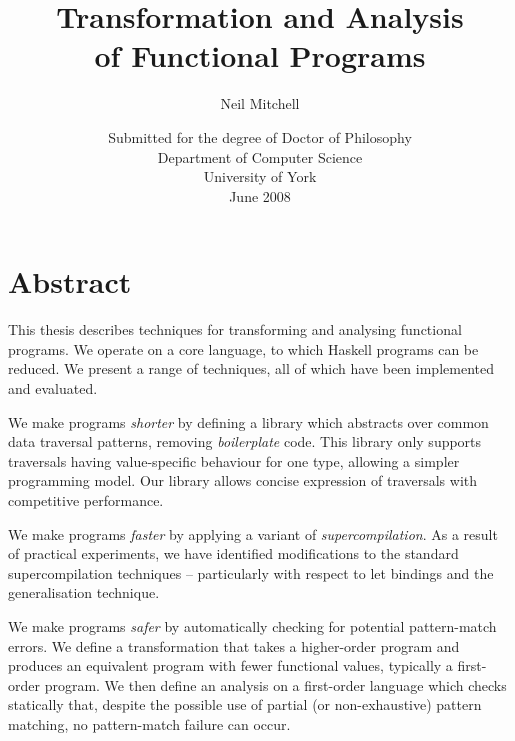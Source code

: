 
\title{Transformation and Analysis \\ of Functional Programs}
\author{Neil Mitchell}
\date{\normalsize{
    \vspace{20mm}
    Submitted for the degree of Doctor of Philosophy \\
    \vspace{10mm}
    Department of Computer Science \\
    University of York \\
    June 2008}}

\maketitle

\setcounter{page}{2}

\chapter*{Abstract}

This thesis describes techniques for transforming and analysing functional programs. We operate on a core language, to which Haskell programs can be reduced. We present a range of techniques, all of which have been implemented and evaluated.

We make programs \textit{shorter} by defining a library which abstracts over common data traversal patterns, removing \textit{boilerplate} code. This library only supports traversals having value-specific behaviour for one type, allowing a simpler programming model. Our library allows concise expression of traversals with competitive performance.

We make programs \textit{faster} by applying a variant of \textit{supercompilation}. As a result of practical experiments, we have identified modifications to the standard supercompilation techniques -- particularly with respect to let bindings and the generalisation technique.

We make programs \textit{safer} by automatically checking for potential pattern-match errors. We define a transformation that takes a higher-order program and produces an equivalent program with fewer functional values, typically a first-order program. We then define an analysis on a first-order language which checks statically that, despite the possible use of partial (or non-exhaustive) pattern matching, no pattern-match failure can occur.


\tableofcontents
\listoffigures
\listoftables

